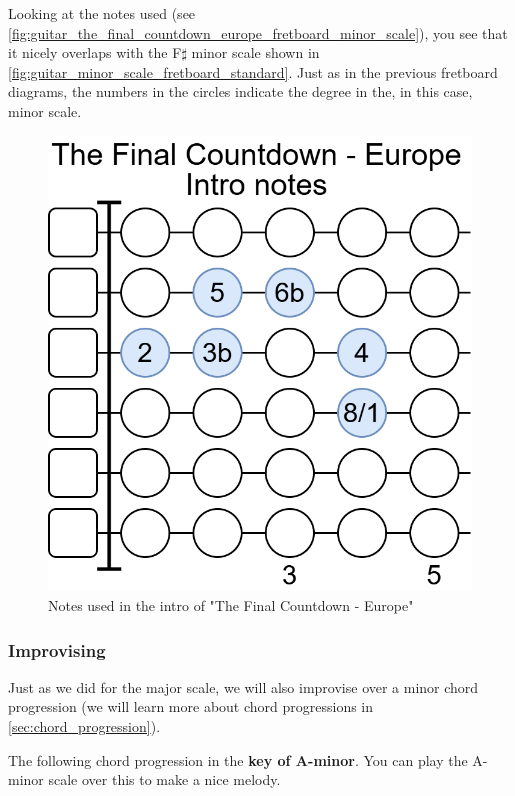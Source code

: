 Looking at the notes used (see \autoref{fig:guitar_the_final_countdown_europe_fretboard_minor_scale}), you see that it nicely overlaps with the F$\sharp$ minor scale shown in \autoref{fig:guitar_minor_scale_fretboard_standard}. Just as in the previous fretboard diagrams, the numbers in the circles indicate the degree in the, in this case, minor scale.

\begin{figure}[h]
	\centering
	\includegraphics[height=0.2\textheight]{../../Images/NotesUsedInTheFinalCountdownEuropeIntro.png}
	\caption{Notes used in the intro of "The Final Countdown - Europe"}
	\label{fig:guitar_the_final_countdown_europe_fretboard_minor_scale}
\end{figure}

\newpage

\subsubsection{Improvising}

Just as we did for the major scale, we will also improvise over a minor chord progression (we will learn more about chord progressions in \autoref{sec:chord_progression}).

The following chord progression in the \textbf{key of A-minor}. You can play the A-minor scale over this to make a nice melody.

